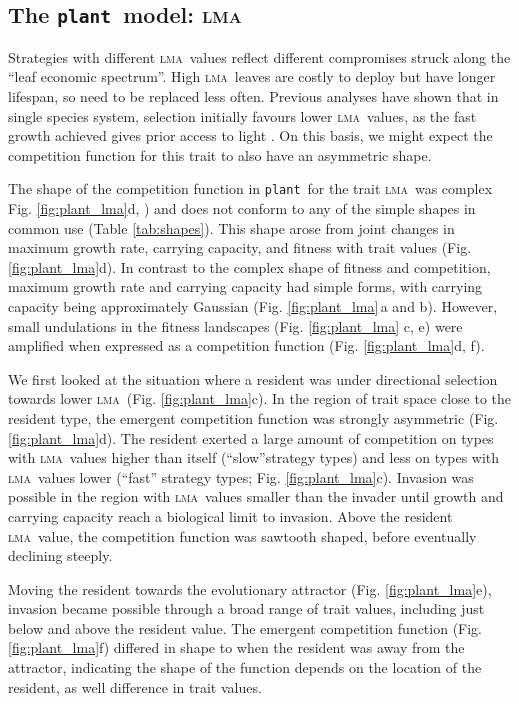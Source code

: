 \documentclass[a4paper,11pt]{article}
\newcommand{\plant}{{\tt plant}}
\newcommand{\lma}{\textsc{lma}}
\begin{document}
\subsection{The \plant\ model: \lma}

Strategies with different \lma\ values reflect different compromises struck along the ``leaf economic spectrum''\citep{Reich-1997,Wright-2004}. High \lma\ leaves are costly to deploy but have longer lifespan, so need to be replaced less often. Previous analyses have shown that in single species system, selection initially favours lower \lma\ values, as the fast growth achieved gives prior access to light \citep{Falster-2017}. On this basis, we might expect the competition function for this trait to also have an asymmetric shape.

The shape of the competition function in \plant\ for the trait \lma\ was complex Fig. \ref{fig:plant_lma}d, ) and does not conform to any of the simple shapes in common use (Table \ref{tab:shapes}). This shape arose from joint changes in maximum growth rate, carrying capacity, and fitness with trait values (Fig. \ref{fig:plant_lma}d). In contrast to the complex shape of fitness and competition, maximum growth rate and carrying capacity had simple forms, with carrying capacity being approximately Gaussian (Fig. \ref{fig:plant_lma}\,a and b). However, small undulations in the fitness landscapes (Fig. \ref{fig:plant_lma} c, e) were amplified when expressed as a competition function (Fig. \ref{fig:plant_lma}d, f). 

We first looked at the situation where a resident was under directional selection towards lower \lma\ (Fig. \ref{fig:plant_lma}c). In the region of trait space close to the resident type, the emergent competition function was strongly asymmetric (Fig. \ref{fig:plant_lma}d). The resident exerted a large amount of competition on types with \lma\ values higher than itself (``slow''strategy types) and less on types with \lma\ values lower (``fast'' strategy types; Fig. \ref{fig:plant_lma}c). Invasion was possible in the region with \lma\ values smaller than the invader until growth and carrying capacity reach a biological limit to invasion. Above the resident \lma\ value, the competition function was sawtooth shaped, before eventually declining steeply.

Moving the resident towards the evolutionary attractor (Fig. \ref{fig:plant_lma}e), invasion became possible through a broad range of trait values, including just below and above the resident value. The emergent competition function (Fig. \ref{fig:plant_lma}f) differed in shape to when the resident was away from the attractor, indicating the shape of the function depends on the location of the resident, as well difference in trait values.
\end{document}
